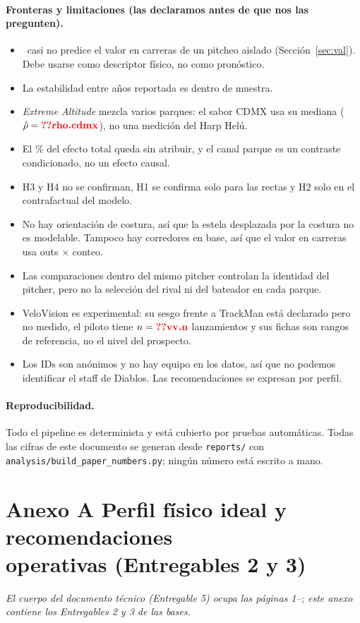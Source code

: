 \documentclass[10pt]{article}
\begin{document}
\paragraph{Fronteras y limitaciones (las declaramos antes de que nos las pregunten).}
\begin{itemize}
  \item \splus\ casi no predice el valor en carreras de un pitcheo aislado (Sección~\ref{sec:val}). Debe usarse como descriptor físico, no como pronóstico.
  \item La estabilidad entre años reportada es dentro de muestra.
  \item \emph{Extreme Altitude} mezcla varios parques: el sabor CDMX usa su mediana ($\rhohat=\cf{rho.cdmx}$), no una medición del Harp Helú.
  \item El \% del efecto total queda sin atribuir, y el canal parque es un contraste condicionado, no un efecto causal.
  \item H3 y H4 no se confirman, H1 se confirma solo para las rectas y H2 solo en el contrafactual del modelo.
  \item No hay orientación de costura, así que la estela desplazada por la costura no es modelable. Tampoco hay corredores en base, así que el valor en carreras usa outs $\times$ conteo.
  \item Las comparaciones dentro del mismo pitcher controlan la identidad del pitcher, pero no la selección del rival ni del bateador en cada parque.
  \item VeloVision es experimental: su sesgo frente a TrackMan está declarado pero no medido, el piloto tiene $n=\cf{vv.n}$ lanzamientos y sus fichas son rangos de referencia, no el nivel del prospecto.
  \item Los IDs son anónimos y no hay equipo en los datos, así que no podemos identificar el staff de Diablos. Las recomendaciones se expresan por perfil.
\end{itemize}

\paragraph{Reproducibilidad.} Todo el pipeline es determinista y está cubierto por pruebas automáticas. Todas las cifras de este documento se generan desde \texttt{reports/} con \texttt{analysis/build\_paper\_numbers.py}; ningún número está escrito a mano.

\label{fin:cuerpo}
\clearpage
\appendix
\renewcommand{\thesection}{A}
\setcounter{section}{1}
\section*{Anexo A \textemdash{} Perfil físico ideal y recomendaciones\\ operativas (Entregables 2 y 3)}
\noindent\emph{El cuerpo del documento técnico (Entregable 5) ocupa las páginas 1--\pageref{fin:cuerpo}; este anexo contiene los Entregables 2 y 3 de las bases.}


\end{document}
